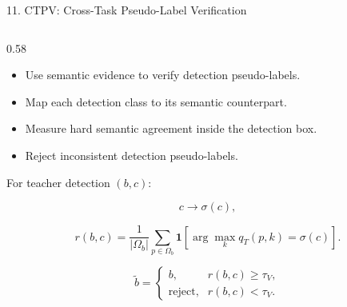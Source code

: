 \documentclass[aspectratio=169,11pt]{beamer}
\begin{document}
\begin{frame}[fragile]{11. CTPV: Cross-Task Pseudo-Label Verification}

\fontsize{7.1}{7.7}\selectfont

\setlength{\abovedisplayskip}{1.5pt}
\setlength{\belowdisplayskip}{1.5pt}
\setlength{\abovedisplayshortskip}{1pt}
\setlength{\belowdisplayshortskip}{1pt}
\setlength{\jot}{1pt}

\vspace{-0.12cm}

\begin{columns}[T,onlytextwidth]

\begin{column}{0.58\textwidth}

\begin{itemize}
  \setlength{\itemsep}{-1pt}
  \setlength{\parskip}{0pt}
  \setlength{\parsep}{0pt}
  \setlength{\topsep}{1pt}
  \item Use semantic evidence to verify detection pseudo-labels.
  \item Map each detection class to its semantic counterpart.
  \item Measure hard semantic agreement inside the detection box.
  \item Reject inconsistent detection pseudo-labels.
\end{itemize}

\vspace{-0.05cm}

For teacher detection $(b,c)$:

\vspace{-0.08cm}

\[
c\rightarrow\sigma(c),
\]

\vspace{-0.12cm}

\[
r(b,c)
=
\frac{1}{|\Omega_b|}
\sum_{p\in\Omega_b}
\mathbf{1}
\left[
\arg\max_k q_T(p,k)
=
\sigma(c)
\right].
\]

\vspace{-0.12cm}

\[
\tilde b
=
\begin{cases}
b, & r(b,c)\ge\tau_V,\\[-0.5mm]
\text{reject}, & r(b,c)<\tau_V.
\end{cases}
\]



\end{column}
\end{columns}
\end{frame}
\end{document}
